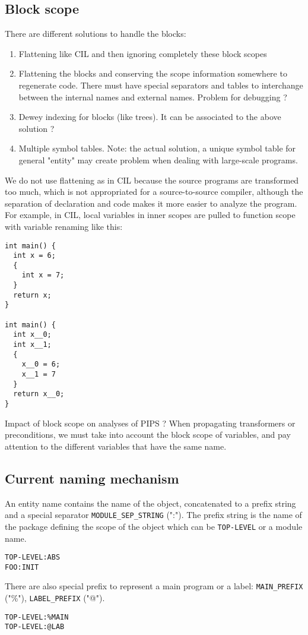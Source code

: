 \documentclass[a4paper]{article}
\begin{document}
\subsection{Block scope}
There are different solutions to handle the blocks:
\begin{enumerate}
\item Flattening like CIL \cite{Necu02} and then ignoring completely these block
  scopes
\item Flattening the blocks and conserving the scope information 
  somewhere to regenerate code. There must have special separators and tables
  to interchange between the internal names and external names. Problem for
  debugging ?
\item Dewey indexing for blocks (like trees). It can be associated to
  the above solution ?
\item Multiple symbol tables. Note: the actual solution, a unique symbol table for general
"entity" may create problem when dealing with large-scale programs. 
\end{enumerate}
We do not use flattening as in CIL because the source
programs are transformed too much, which is not appropriated for a source-to-source
compiler, although the separation of declaration and code makes it more
easier to analyze the program. For example, in CIL, local variables in inner scopes are pulled to
function scope with variable renaming like this: 
\begin{verbatim}
int main() {
  int x = 6;
  {
    int x = 7;
  }
  return x;
}

int main() {
  int x__0;
  int x__1; 
  {
    x__0 = 6;
    x__1 = 7
  }
  return x__0;
}
\end{verbatim}
Impact of block scope on analyses of PIPS ? When propagating transformers or
preconditions, we must take into account the block scope of variables, and pay
attention to the different variables that have the same name.  

\subsection{Current naming mechanism}
An entity name contains the name of the object, concatenated to a prefix
string and a special separator \verb/MODULE_SEP_STRING/ (":"). The prefix
string is the name of the package defining the scope of the object which
can be \verb/TOP-LEVEL/ or a module name. 
\begin{verbatim}
TOP-LEVEL:ABS
FOO:INIT
\end{verbatim}  
There are also special prefix to represent a main program or a label:
\verb/MAIN_PREFIX/ ("\%"), \verb/LABEL_PREFIX/ ("@").
\begin{verbatim}
TOP-LEVEL:%MAIN
TOP-LEVEL:@LAB
\end{verbatim}  
\end{document}
